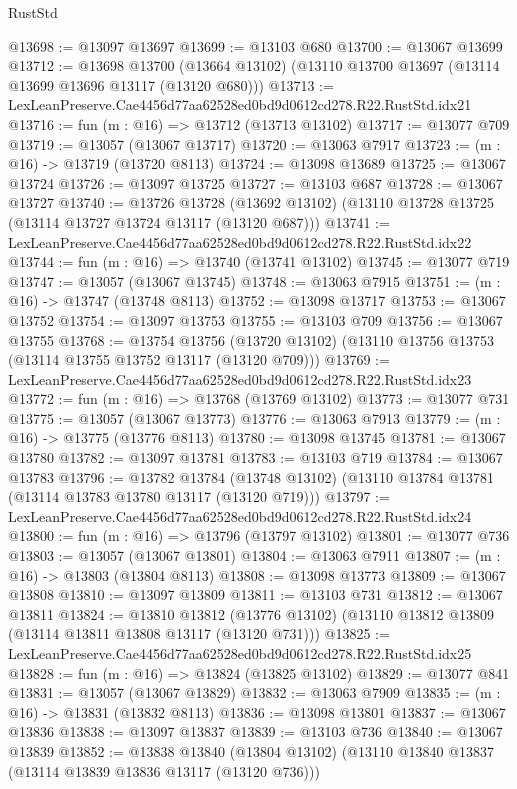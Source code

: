 \begin{lexlean}{RustStd}
\begin{coremodule}
@13698 := @13097 @13697
@13699 := @13103 @680
@13700 := @13067 @13699
@13712 := @13698
    @13700
    (@13664 @13102)
    (@13110 @13700 @13697 (@13114 @13699 @13696 @13117 (@13120 @680)))
@13713 := LexLeanPreserve.Cae4456d77aa62528ed0bd9d0612cd278.R22.RustStd.idx21
@13716 := fun (m : @16) => @13712 (@13713 @13102)
@13717 := @13077 @709
@13719 := @13057 (@13067 @13717)
@13720 := @13063 @7917
@13723 := (m : @16) -> @13719 (@13720 @8113)
@13724 := @13098 @13689
@13725 := @13067 @13724
@13726 := @13097 @13725
@13727 := @13103 @687
@13728 := @13067 @13727
@13740 := @13726
    @13728
    (@13692 @13102)
    (@13110 @13728 @13725 (@13114 @13727 @13724 @13117 (@13120 @687)))
@13741 := LexLeanPreserve.Cae4456d77aa62528ed0bd9d0612cd278.R22.RustStd.idx22
@13744 := fun (m : @16) => @13740 (@13741 @13102)
@13745 := @13077 @719
@13747 := @13057 (@13067 @13745)
@13748 := @13063 @7915
@13751 := (m : @16) -> @13747 (@13748 @8113)
@13752 := @13098 @13717
@13753 := @13067 @13752
@13754 := @13097 @13753
@13755 := @13103 @709
@13756 := @13067 @13755
@13768 := @13754
    @13756
    (@13720 @13102)
    (@13110 @13756 @13753 (@13114 @13755 @13752 @13117 (@13120 @709)))
@13769 := LexLeanPreserve.Cae4456d77aa62528ed0bd9d0612cd278.R22.RustStd.idx23
@13772 := fun (m : @16) => @13768 (@13769 @13102)
@13773 := @13077 @731
@13775 := @13057 (@13067 @13773)
@13776 := @13063 @7913
@13779 := (m : @16) -> @13775 (@13776 @8113)
@13780 := @13098 @13745
@13781 := @13067 @13780
@13782 := @13097 @13781
@13783 := @13103 @719
@13784 := @13067 @13783
@13796 := @13782
    @13784
    (@13748 @13102)
    (@13110 @13784 @13781 (@13114 @13783 @13780 @13117 (@13120 @719)))
@13797 := LexLeanPreserve.Cae4456d77aa62528ed0bd9d0612cd278.R22.RustStd.idx24
@13800 := fun (m : @16) => @13796 (@13797 @13102)
@13801 := @13077 @736
@13803 := @13057 (@13067 @13801)
@13804 := @13063 @7911
@13807 := (m : @16) -> @13803 (@13804 @8113)
@13808 := @13098 @13773
@13809 := @13067 @13808
@13810 := @13097 @13809
@13811 := @13103 @731
@13812 := @13067 @13811
@13824 := @13810
    @13812
    (@13776 @13102)
    (@13110 @13812 @13809 (@13114 @13811 @13808 @13117 (@13120 @731)))
@13825 := LexLeanPreserve.Cae4456d77aa62528ed0bd9d0612cd278.R22.RustStd.idx25
@13828 := fun (m : @16) => @13824 (@13825 @13102)
@13829 := @13077 @841
@13831 := @13057 (@13067 @13829)
@13832 := @13063 @7909
@13835 := (m : @16) -> @13831 (@13832 @8113)
@13836 := @13098 @13801
@13837 := @13067 @13836
@13838 := @13097 @13837
@13839 := @13103 @736
@13840 := @13067 @13839
@13852 := @13838
    @13840
    (@13804 @13102)
    (@13110 @13840 @13837 (@13114 @13839 @13836 @13117 (@13120 @736)))

\end{coremodule}
\end{lexlean}
